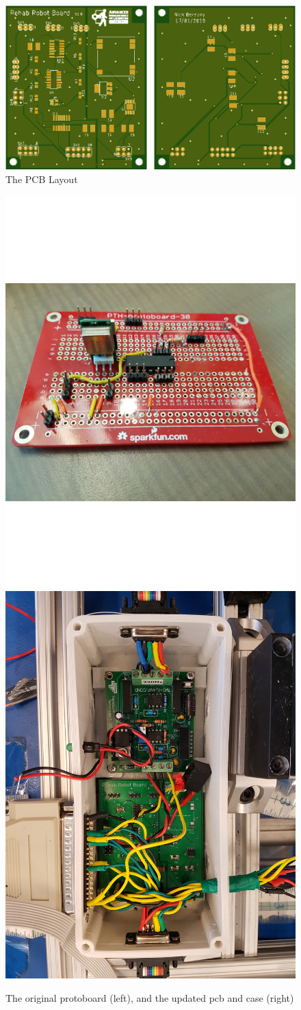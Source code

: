\documentclass[12pt]{report}
\begin{document}
	\begin{figure}[h] 
		\centering
		\includegraphics[width=0.75\linewidth]{pcb_pic}
		\caption{The PCB Layout}
		\label{fig:pcb_pic}
	\end{figure}
	
		\begin{figure}[h] 
		\centering
		\includegraphics[width=0.4\linewidth]{protoboard}
		\: \:
		\includegraphics[width=0.4\linewidth]{pcb_case}
		\caption{The original protoboard (left), and the updated pcb and case (right)}
		\label{fig:proto}
	\end{figure}
	
\end{document}
